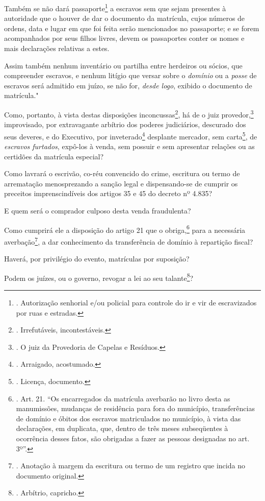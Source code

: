 Também se não dará passaporte\footnote{. Autorização senhorial e/ou
  policial para controle do ir e vir de escravizados por ruas e
  estradas.} a escravos sem que sejam presentes à autoridade que o
houver de dar o documento da matrícula, cujos números de ordens, data e
lugar em que foi feita serão mencionados no passaporte; e se forem
acompanhados por seus filhos livres, devem os passaportes conter os
nomes e mais declarações relativas a estes.

Assim também nenhum inventário ou partilha entre herdeiros ou sócios,
que compreender escravos, e nenhum litígio que versar sobre o
\emph{domínio} ou a \emph{posse} de escravos será admitido em juízo, se
não for, \emph{desde logo}, exibido o documento de matrícula."

Como, portanto, à vista destas disposições inconcussas\footnote{.
  Irrefutáveis, incontestáveis.}, há de o juiz provedor,\footnote{. O
  juiz da Provedoria de Capelas e Resíduos.} improvisado, por
extravagante arbítrio dos poderes judiciários, descurado dos seus
deveres, e do Executivo, por inveterado\footnote{. Arraigado,
  acostumado.} desplante mercador, sem carta\footnote{. Licença,
  documento.}, de \emph{escravos furtados}, expô-los à venda, sem
possuir e sem apresentar relações ou as certidões da matrícula especial?

Como lavrará o escrivão, co-réu convencido do crime, escritura ou termo
de arrematação menosprezando a sanção legal e dispensando-se de cumprir
os preceitos imprenscindíveis dos artigos 35 e 45 do decreto nº 4.835?

E quem será o comprador culposo desta venda fraudulenta?

Como cumprirá ele a disposição do artigo 21 que o obriga,\footnote{.
  Art. 21. ``Os encarregados da matrícula averbarão no livro desta as
  manumissões, mudanças de residência para fora do município,
  transferências de domínio e óbitos dos escravos matriculados no
  município, à vista das declarações, em duplicata, que, dentro de três
  meses subseqüentes à ocorrência desses fatos, são obrigadas a fazer as
  pessoas designadas no art. 3º''.} para a necessária
averbação\footnote{. Anotação à margem da escritura ou termo de um
  registro que incida no documento original.}, a dar conhecimento da
transferência de domínio à repartição fiscal?

Haverá, por privilégio do evento, matrículas por suposição?

Podem os juízes, ou o governo, revogar a lei ao seu talante\footnote{.
  Arbítrio, capricho.}?

